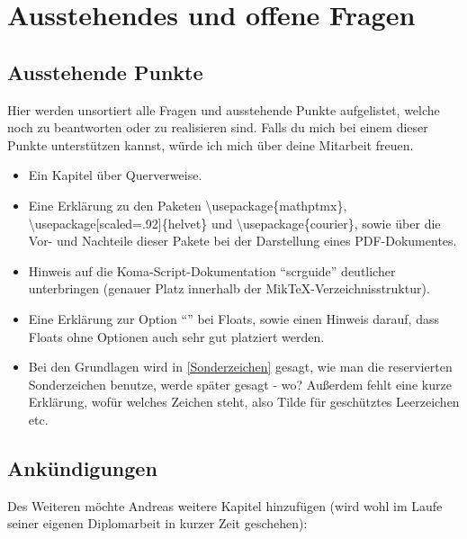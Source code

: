 %
%

\chapter{Ausstehendes und offene Fragen}
\label{sec:ausstehendes}

\section{Ausstehende Punkte}

Hier werden unsortiert alle Fragen und ausstehende Punkte aufgelistet, welche noch zu beantworten oder zu realisieren sind. Falls du mich bei einem dieser Punkte unterstützen kannst, würde ich mich über deine Mitarbeit freuen.

\begin{itemize}
	\item Ein Kapitel über Querverweise.
	\item Eine Erklärung zu den Paketen \textbackslash use\-package\{mathptmx\},\\ \textbackslash usepackage[scaled=.92]\{helvet\} und \textbackslash usepackage\{courier\}, sowie über die
	Vor- und Nachteile dieser Pakete bei der Darstellung eines PDF-Dokumentes.
	\item Hinweis auf die Koma-Script-Dokumentation \enquote{scrguide} deutlicher unterbringen (genauer Platz innerhalb der MikTeX-Verzeichnisstruktur).
	\item Eine Erklärung zur Option \enquote{\!} bei Floats, sowie einen Hinweis darauf, dass Floats ohne Optionen auch sehr gut platziert werden.
	\item Bei den Grundlagen wird in \cref{Sonderzeichen} gesagt, wie man die reservierten Sonderzeichen benutze, werde später gesagt - wo? Außerdem fehlt eine kurze Erklärung, wofür welches Zeichen steht, also Tilde für geschütztes Leerzeichen etc.
\end{itemize}

\section{Ankündigungen}

Des Weiteren möchte Andreas weitere Kapitel hinzufügen (wird wohl im Laufe seiner eigenen Diplomarbeit
in kurzer Zeit geschehen):

